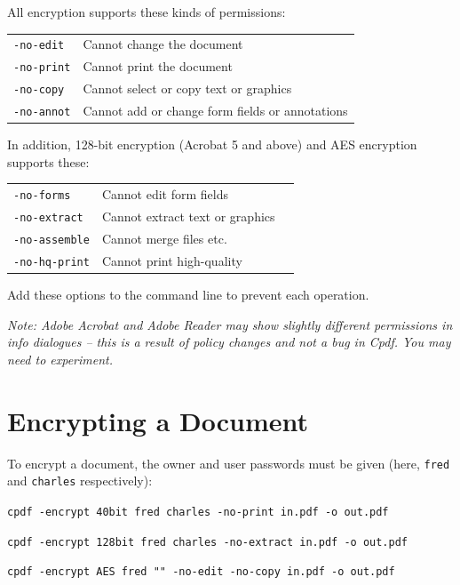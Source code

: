 \documentclass{book}
\begin{document}
   \vspace{2mm}
   \noindent All encryption supports these kinds of permissions:

   \vspace{2mm}
   \begin{tabular}{ll}
     \texttt{-no-edit} & Cannot change the document\\
     \texttt{-no-print} & Cannot print the document\\
     \texttt{-no-copy} & Cannot select or copy text or graphics\\
     \texttt{-no-annot} & Cannot add or change form fields or annotations\\
   \end{tabular}

   \vspace{2mm}
   \noindent In addition, 128-bit encryption (Acrobat 5 and above) and AES encryption supports these:

   \vspace{2mm}
   \begin{tabular}{lll}
     \texttt{-no-forms} & Cannot edit form fields&\\
     \texttt{-no-extract} & Cannot extract text or graphics&\\
     \texttt{-no-assemble} & Cannot merge files etc.&\\
     \texttt{-no-hq-print} & Cannot print high-quality&\\
   \end{tabular}

  \vspace{2mm}
  \noindent Add these options to the command line to prevent each operation.

  \vspace{2mm}
\noindent\textit{Note: Adobe Acrobat and Adobe Reader may show slightly different permissions in info dialogues -- this is a result of policy changes and not a bug in \textup{Cpdf}. You may need to experiment.}

  \vspace{2mm}

  \section{Encrypting a Document}
  To encrypt a document, the owner and user passwords must be given (here, \texttt{fred} and \texttt{charles} respectively):

  \begin{framed}
    \noindent\small\verb!cpdf -encrypt 40bit fred charles -no-print in.pdf -o out.pdf!

    \vspace{1.5mm}
    \noindent\small\verb!cpdf -encrypt 128bit fred charles -no-extract in.pdf -o out.pdf!

    \vspace{1.5mm}
    \noindent\small\verb!cpdf -encrypt AES fred "" -no-edit -no-copy in.pdf -o out.pdf!
  \end{framed}
\end{document}
